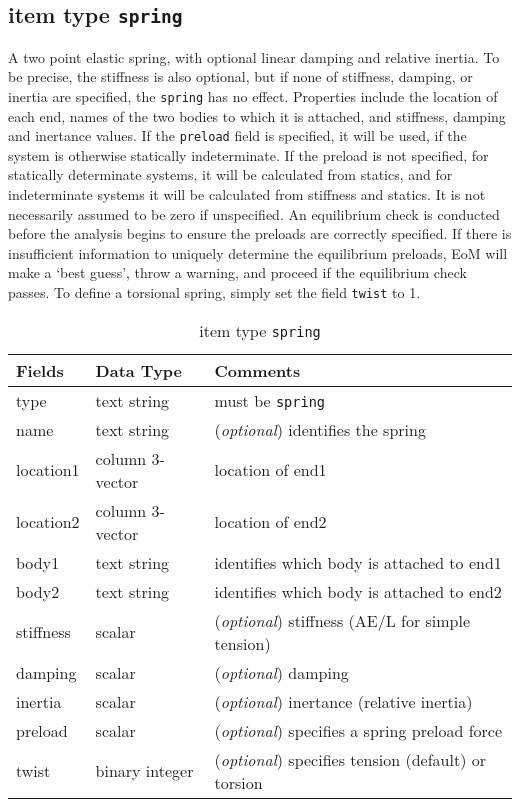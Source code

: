 \subsection{item type \texttt{spring}}
A two point elastic spring, with optional linear damping and relative inertia.  To be precise, the stiffness is also optional, but if none of stiffness, damping, or inertia are specified, the \texttt{spring} has no effect.  Properties include the location of each end, names of the two bodies to which it is attached, and stiffness, damping and inertance values.  If the \texttt{preload} field is specified, it will be used, if the system is otherwise statically indeterminate.  If the preload is not specified, for statically determinate systems, it will be calculated from statics, and for indeterminate systems it will be calculated from stiffness and statics.  It is not necessarily assumed to be zero if unspecified.  An equilibrium check is conducted before the analysis begins to ensure the preloads are correctly specified.  If there is insufficient information to uniquely determine the equilibrium preloads, EoM will make a `best guess', throw a warning, and proceed if the equilibrium check passes.  To define a torsional spring, simply set the field \texttt{twist} to 1.

\begin{table}[!h]
\caption{item type \texttt{spring}}
\label{spring}
\begin{center}
\begin{tabular}{lll}
\toprule
Fields & Data Type & Comments\\
\midrule
type & text string & must be \texttt{spring}\\
name & text string & (\emph{optional}) identifies the spring\\
location1 & column 3-vector & location of end1\\
location2 & column 3-vector & location of end2\\
body1 & text string & identifies which body is attached to end1\\
body2 & text string & identifies which body is attached to end2\\
stiffness & scalar & (\emph{optional}) stiffness (AE/L for simple tension)\\
damping & scalar & (\emph{optional}) damping\\
inertia & scalar & (\emph{optional}) inertance (relative inertia)\\
preload & scalar & (\emph{optional}) specifies a spring preload force\\
twist & binary integer & (\emph{optional}) specifies tension (default) or torsion \\
\bottomrule
\end{tabular}
\end{center}
\end{table}
\clearpage

